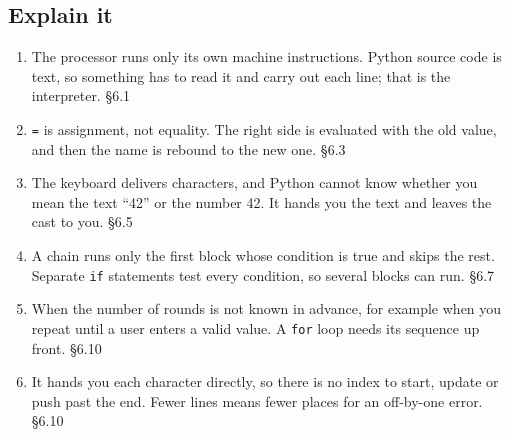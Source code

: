 \documentclass[11pt]{article}
\begin{document}
\begin{keepsection}\subsection{Explain it}

\begin{enumerate}
\item The processor runs only its own machine instructions. Python source code is text, so something has to read it and carry out each line; that is the interpreter. \hfill{\small\color{FAUblue}§6.1}
\item \texttt{=} is assignment, not equality. The right side is evaluated with the old value, and then the name is rebound to the new one. \hfill{\small\color{FAUblue}§6.3}
\item The keyboard delivers characters, and Python cannot know whether you mean the text “42” or the number 42. It hands you the text and leaves the cast to you. \hfill{\small\color{FAUblue}§6.5}
\item A chain runs only the first block whose condition is true and skips the rest. Separate \texttt{if} statements test every condition, so several blocks can run. \hfill{\small\color{FAUblue}§6.7}
\item When the number of rounds is not known in advance, for example when you repeat until a user enters a valid value. A \texttt{for} loop needs its sequence up front. \hfill{\small\color{FAUblue}§6.10}
\item It hands you each character directly, so there is no index to start, update or push past the end. Fewer lines means fewer places for an off-by-one error. \hfill{\small\color{FAUblue}§6.10}
\end{enumerate}

\end{keepsection}
\end{document}

